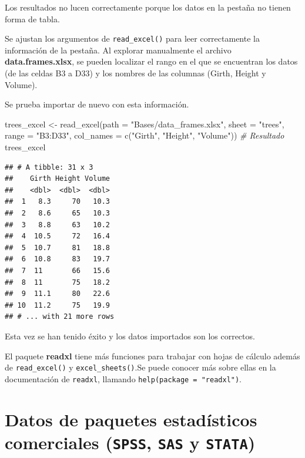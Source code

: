 \documentclass[
]{book}
\newenvironment{Shaded}{\begin{snugshade}}{\end{snugshade}}
\newcommand{\AttributeTok}[1]{\textcolor[rgb]{0.77,0.63,0.00}{#1}}
\newcommand{\CommentTok}[1]{\textcolor[rgb]{0.56,0.35,0.01}{\textit{#1}}}
\newcommand{\FunctionTok}[1]{\textcolor[rgb]{0.00,0.00,0.00}{#1}}
\newcommand{\NormalTok}[1]{#1}
\newcommand{\OtherTok}[1]{\textcolor[rgb]{0.56,0.35,0.01}{#1}}
\newcommand{\StringTok}[1]{\textcolor[rgb]{0.31,0.60,0.02}{#1}}
\begin{document}
Los resultados no lucen correctamente porque los datos en la pestaña no tienen forma de tabla.

Se ajustan los argumentos de \texttt{read\_excel()} para leer correctamente la información de la pestaña. Al explorar manualmente el archivo \textbf{data.frames.xlsx}, se pueden localizar el rango en el que se encuentran los datos (de las celdas B3 a D33) y los nombres de las columnas (Girth, Height y Volume).

Se prueba importar de nuevo con esta información.

\begin{Shaded}
\begin{Highlighting}[]
\NormalTok{trees\_excel }\OtherTok{\textless{}{-}} \FunctionTok{read\_excel}\NormalTok{(}\AttributeTok{path =} \StringTok{"Bases/data\_frames.xlsx"}\NormalTok{, }\AttributeTok{sheet =} \StringTok{"trees"}\NormalTok{, }
                          \AttributeTok{range =} \StringTok{"B3:D33"}\NormalTok{, }
                          \AttributeTok{col\_names =} \FunctionTok{c}\NormalTok{(}\StringTok{"Girth"}\NormalTok{, }\StringTok{"Height"}\NormalTok{, }\StringTok{"Volume"}\NormalTok{))}
\CommentTok{\# Resultado}
\NormalTok{trees\_excel}
\end{Highlighting}
\end{Shaded}

\begin{verbatim}
## # A tibble: 31 x 3
##    Girth Height Volume
##    <dbl>  <dbl>  <dbl>
##  1   8.3     70   10.3
##  2   8.6     65   10.3
##  3   8.8     63   10.2
##  4  10.5     72   16.4
##  5  10.7     81   18.8
##  6  10.8     83   19.7
##  7  11       66   15.6
##  8  11       75   18.2
##  9  11.1     80   22.6
## 10  11.2     75   19.9
## # ... with 21 more rows
\end{verbatim}

Esta vez se han tenido éxito y los datos importados son los correctos.

El paquete \textbf{readxl} tiene más funciones para trabajar con hojas de cálculo además de \texttt{read\_excel()} y \texttt{excel\_sheets()}.Se puede conocer más sobre ellas en la documentación de \texttt{readxl}, llamando \texttt{help(package\ =\ "readxl")}.

\hypertarget{datos-de-paquetes-estaduxedsticos-comerciales-spss-sas-y-stata}{%
\section{\texorpdfstring{Datos de paquetes estadísticos comerciales (\texttt{SPSS}, \texttt{SAS} y \texttt{STATA})}{Datos de paquetes estadísticos comerciales (SPSS, SAS y STATA)}}\label{datos-de-paquetes-estaduxedsticos-comerciales-spss-sas-y-stata}}
\end{document}
